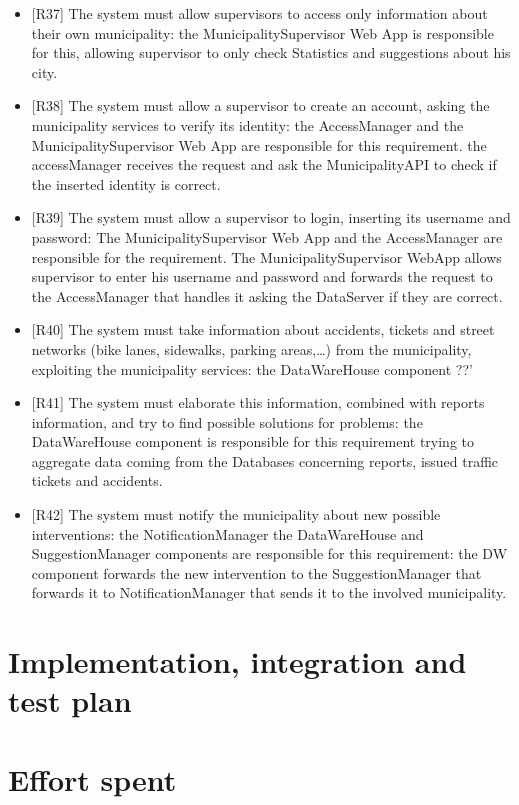 \documentclass[a4paper]{report}
\begin{document}
\begin{itemize}
\item {[R37]}	\label{R37}The system must allow supervisors to access only information about their own municipality: the MunicipalitySupervisor Web App  is responsible for this, allowing supervisor to only check Statistics and suggestions about his city. 
\item {[R38]}	\label{R38}The system must allow a supervisor to create an account, asking the municipality services to verify its identity: the AccessManager and the MunicipalitySupervisor Web App are responsible for this requirement. the accessManager receives the request and ask the MunicipalityAPI to check if the inserted identity is correct.
\item {[R39]}	\label{R39}The system must allow a supervisor to login, inserting its username and password: The MunicipalitySupervisor Web App and the AccessManager are responsible for the requirement. The MunicipalitySupervisor WebApp allows supervisor to enter his username and password and forwards the request to the AccessManager that handles it asking the DataServer if they are correct.
\item {[R40]}	\label{R40}The system must take information about accidents, tickets and street networks (bike lanes, sidewalks, parking areas,…) from the municipality, exploiting the municipality services: the DataWareHouse component ??'
\item {[R41]}	\label{R41}The system must elaborate this information, combined with reports information, and try to find possible solutions for problems: the DataWareHouse component is responsible for this requirement trying to aggregate data coming from the Databases concerning reports, issued traffic tickets and accidents.
\item {[R42]}	\label{R42}The system must notify the municipality about new possible interventions: the NotificationManager the DataWareHouse and SuggestionManager components are responsible for this requirement: the DW component forwards the new intervention to the SuggestionManager that forwards it to NotificationManager that sends it to  the involved municipality.
\end{itemize}

\chapter{Implementation, integration and test plan}

\chapter{Effort spent}
\end{document}
